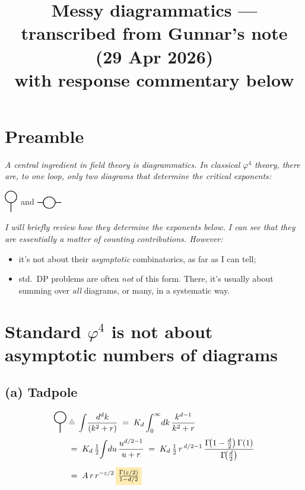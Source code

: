 \documentclass[11pt,a4paper]{article}
\title{\large Messy diagrammatics --- transcribed from Gunnar's note (29 Apr 2026)\\
\normalsize with response commentary below}
\author{}
\date{}
\newcommand{\hl}[1]{\colorbox{gunnaryellow}{$#1$}}
\newcommand{\tadpole}{%
\begin{tikzpicture}[baseline=-0.5ex]
  \draw[thick] (0,0.25) circle (0.25);
  \draw[thick] (0,0)--(0,-0.4);
\end{tikzpicture}}
\newcommand{\sunset}{%
\begin{tikzpicture}[baseline=-0.5ex]
  \draw[thick] (-0.5,0)--(-0.25,0);
  \draw[thick] (0.25,0)--(0.5,0);
  \draw[thick] (0,0) circle (0.25);
\end{tikzpicture}}
\begin{document}
\maketitle
\vspace{-2.5em}

\section*{Preamble}

\textit{A central ingredient in field theory is diagrammatics. In classical $\varphi^4$ theory, there are, to one loop, only two diagrams that determine the critical exponents:}
\begin{center}
\large $\tadpole$ \quad and \quad $\sunset$
\end{center}

\textit{I will briefly review how they determine the exponents below. I can see that they are essentially a matter of counting contributions. However:}
\begin{itemize}[leftmargin=2em,itemsep=2pt]
  \item it's not about their \emph{asymptotic} combinatorics, as far as I can tell;
  \item std.\ DP problems are often \emph{not} of this form. There, it's usually about summing over \emph{all} diagrams, or many, in a systematic way.
\end{itemize}

\hrulefill

\section{Standard $\varphi^4$ is not about asymptotic numbers of diagrams}

\subsection*{(a) Tadpole}

\begin{align*}
\tadpole \;&\hat{=}\; \int\!\frac{d^d k}{(k^2+r)} \;=\; K_d \int_0^\infty\!dk\,\frac{k^{d-1}}{k^2+r} \\[2pt]
&=\; K_d\,\tfrac{1}{2}\!\int\!du\,\frac{u^{d/2-1}}{u+r}
\;=\; K_d\,\tfrac{1}{2}\,r^{\,d/2-1}\,\frac{\Gamma\!\big(1-\tfrac{d}{2}\big)\,\Gamma(1)}{\Gamma\!\big(\tfrac{d}{2}\big)} \\[4pt]
&=\; A\,r\,r^{-\varepsilon/2}\,\hl{\frac{\Gamma(\varepsilon/2)}{1-d/2}}
\end{align*}
\end{document}
